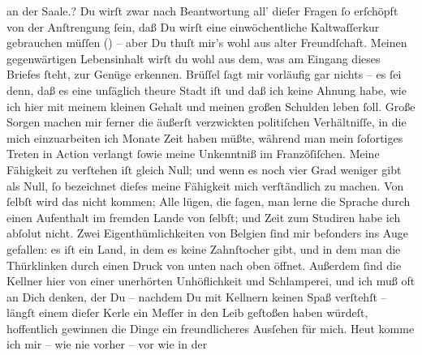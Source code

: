 \begin{ledgroupsized}[t]{13cm}
{{{                     an der Saale.}}}\label{K_L02663-55h}? Du wirſt zwar nach Beantwortung all’ dieſer Fragen
               ſo erſchöpft von der Anſtrengung ſein, daß Du wirſt eine einwöchentliche
               Kaltwaſſerkur gebrauchen müſſen (\label{K_L02663-4v}\label{K_L02663-4h}) – aber Du thuſt mir’s
               wohl aus alter Freundſchaft.\pend
           \pstart
           Meinen gegenwärtigen Lebensinhalt wirſt du wohl aus dem, was am Eingang dieses
               Briefes ſteht, zur Genüge erkennen. Brüſſel ſagt
               mir vorläufig gar nichts – es ſei denn, daß es eine unſäglich theure Stadt iſt und daß ich keine Ahnung habe, wie
               ich hier mit meinem kleinen Gehalt und meinen großen Schulden leben ſoll. Große
               Sorgen machen mir ferner die äußerſt verzwickten politiſchen Verhältniſſe, in die
               mich einzuarbeiten ich Monate Zeit haben müßte, während man {\pb}mein ſofortiges Treten in Action verlangt ſowie
               meine Unkenntniß im Franzöſiſchen. Meine Fähigkeit zu verſtehen iſt gleich Null; und
               wenn es noch vier Grad weniger gibt als Null, ſo bezeichnet dieſes meine Fähigkeit
               mich verſtändlich zu machen. Von ſelbſt wird das nicht kommen; Alle lügen, die ſagen,
               man lerne die Sprache durch einen Aufenthalt im fremden Lande von ſelbſt; und Zeit
               zum Studiren habe ich abſolut nicht. Zwei Eigenthümlichkeiten von Belgien ſind mir beſonders ins Auge gefallen: es iſt ein Land, in dem es keine
               Zahnſtocher gibt, und in dem man die Thürklinken durch einen Druck von unten nach
               oben öffnet. Außerdem ſind die Kellner hier von einer unerhörten Unhöflichkeit und
               Schlamperei, und ich muß oft an Dich denken, der Du – nachdem Du mit Kellnern keinen
               Spaß verſtehſt – längſt einem dieſer Kerle ein Meſſer in den Leib geſtoßen haben
               würdeſt, hoffentlich gewinnen die Dinge ein freundlicheres Ausſehen für mich. Heut komme ich mir – wie nie vorher – vor wie in der

\end{ledgroupsized}
